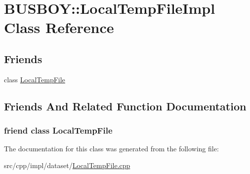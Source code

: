 \hypertarget{classBUSBOY_1_1LocalTempFileImpl}{
\section{BUSBOY::LocalTempFileImpl Class Reference}
\label{classBUSBOY_1_1LocalTempFileImpl}
}
\subsection*{Friends}
\begin{DoxyCompactItemize}
\item 
class \hyperlink{classBUSBOY_1_1LocalTempFileImpl_aa0ae33c30e1e529a186030e0bb1035e2}{LocalTempFile}
\end{DoxyCompactItemize}


\subsection{Friends And Related Function Documentation}
\hypertarget{classBUSBOY_1_1LocalTempFileImpl_aa0ae33c30e1e529a186030e0bb1035e2}{
\subsubsection[{LocalTempFile}]{\setlength{\rightskip}{0pt plus 5cm}friend class {\bf LocalTempFile}}}
\label{classBUSBOY_1_1LocalTempFileImpl_aa0ae33c30e1e529a186030e0bb1035e2}


The documentation for this class was generated from the following file:\begin{DoxyCompactItemize}
\item 
src/cpp/impl/dataset/\hyperlink{LocalTempFile_8cpp}{LocalTempFile.cpp}\end{DoxyCompactItemize}
